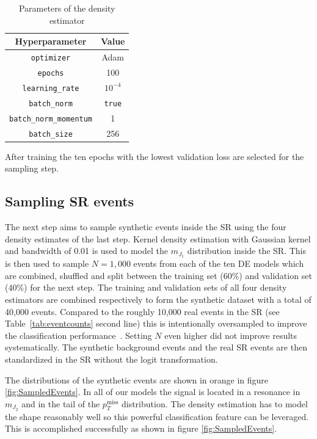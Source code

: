 \documentclass[prd, twocolumn, superscriptaddress,floatfix, nofootinbib, preprintnumbers]{revtex4-2}
\begin{document}
\begin{table}[t]
\begin{center}
\begin{tabular}{| c c |}
\hline
Hyperparameter & Value \\
\hline
\verb|optimizer| & Adam\\
\verb|epochs| & 100\\
\verb|learning_rate| & $10^{-4}$\\
\verb|batch_norm| & \verb|true|\\
\verb|batch_norm_momentum| & 1\\
\verb|batch_size| & 256\\
\hline
\end{tabular}
\caption{Parameters of the density estimator}
\label{tab:DE}
\end{center}
\end{table}
After training the ten epochs with the lowest validation loss are selected for the sampling step.

\subsection{Sampling SR events}

The next step aims to sample synthetic events inside the SR using the four density estimates of the last step. Kernel density estimation with Gaussian kernel and bandwidth of 0.01 is used to model the $m_{J_1}$ distribution inside the SR. This is then used to sample $N=1,000$ events from each of the ten DE models which are combined, shuffled and split between the training set (60\%) and validation set (40\%) for the next step. The training and validation sets of all four 
density estimators are combined respectively to form the synthetic dataset with a total of 40,000 events. Compared to the roughly 10,000 real events in the SR (see Table~\ref{tab:eventcounts} second line) this is intentionally oversampled to improve the classification performance~\cite{Hallin:2021wme}. Setting $N$ even higher did not improve results systematically.  
The synthetic background events and the real SR events are then standardized in the SR without the logit transformation.

The distributions of the synthetic events are shown in orange in figure \ref{fig:SampledEvents}. In all of our models the signal is located in a resonance in $m_{J_2}$ and in the tail of the $p_T^\text{miss}$ distribution. The density estimation has to model the shape reasonably well so this powerful classification feature can be leveraged. This is accomplished successfully as shown in figure \ref{fig:SampledEvents}.
\end{document}
